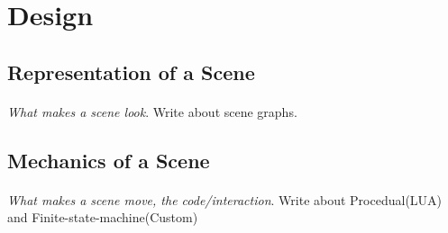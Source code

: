 \section{Design\label{Design}}
\paragraph{}


\subsection{Representation of a Scene}
\paragraph{}
\textit{What makes a scene look}. Write about scene graphs.

\subsection{Mechanics of a Scene}
\paragraph{}
\textit{What makes a scene move, the code/interaction}. Write about Procedual(LUA) and Finite-state-machine(Custom)